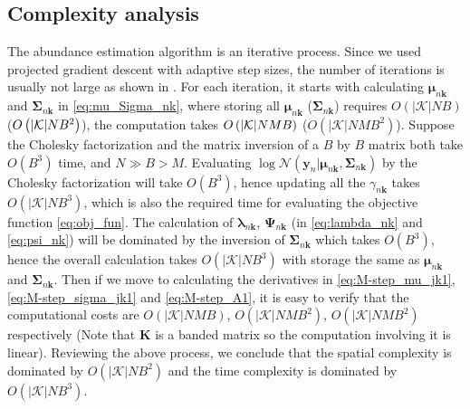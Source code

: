 \documentclass[twocolumn,english]{IEEEtran}
\theoremstyle{plain}
\begin{document}
\subsection{Complexity analysis\label{subsec:Complexity-Analysis}}

The abundance estimation algorithm is an iterative process. Since
we used projected gradient descent with adaptive step sizes, the number
of iterations is usually not large as shown in \cite{guan2011manifold,lin2007projected}.
For each iteration, it starts with calculating $\boldsymbol{\mu}_{n\mathbf{k}}$
and $\boldsymbol{\Sigma}_{n\mathbf{k}}$ in \eqref{eq:mu_Sigma_nk},
where storing all $\boldsymbol{\mu}_{n\mathbf{k}}$ ($\boldsymbol{\Sigma}_{n\mathbf{k}}$)
requires $O\left(\left|\mathcal{K}\right|NB\right)$ ($O\left(\text{\ensuremath{\left|\mathcal{K}\right|}}NB^{2}\right)$),
the computation takes $O\left(\text{\ensuremath{\left|\mathcal{K}\right|}}NMB\right)$
($O\left(\left|\mathcal{K}\right|NMB^{2}\right)$). Suppose the Cholesky
factorization and the matrix inversion of a $B$ by $B$ matrix both
take $O\left(B^{3}\right)$ time, and $N\gg B>M$. Evaluating $\log\mathcal{N}\left(\mathbf{y}_{n}\vert\boldsymbol{\mu}_{n\mathbf{k}},\boldsymbol{\Sigma}_{n\mathbf{k}}\right)$
by the Cholesky factorization will take $O\left(B^{3}\right)$, hence
updating all the $\gamma_{n\mathbf{k}}$ takes $O\left(\left|\mathcal{K}\right|NB^{3}\right)$,
which is also the required time for evaluating the objective function
\eqref{eq:obj_fun}. The calculation of $\boldsymbol{\lambda}_{n\mathbf{k}}$,
$\boldsymbol{\Psi}_{n\mathbf{k}}$ (in \eqref{eq:lambda_nk} and \eqref{eq:psi_nk})
will be dominated by the inversion of $\boldsymbol{\Sigma}_{n\mathbf{k}}$
which takes $O\left(B^{3}\right)$, hence the overall calculation
takes $O\left(\left|\mathcal{K}\right|NB^{3}\right)$ with storage
the same as $\boldsymbol{\mu}_{n\mathbf{k}}$ and $\boldsymbol{\Sigma}_{n\mathbf{k}}$.
Then if we move to calculating the derivatives in \eqref{eq:M-step_mu_jk1},
\eqref{eq:M-step_sigma_jk1} and \eqref{eq:M-step_A1}, it is easy
to verify that the computational costs are $O\left(\left|\mathcal{K}\right|NMB\right)$,
$O\left(\left|\mathcal{K}\right|NMB^{2}\right)$, $O\left(\left|\mathcal{K}\right|NMB^{2}\right)$
respectively (Note that $\mathbf{K}$ is a banded matrix so the computation
involving it is linear). Reviewing the above process, we conclude
that the spatial complexity is dominated by $O\left(\left|\mathcal{K}\right|NB^{2}\right)$
and the time complexity is dominated by $O\left(\left|\mathcal{K}\right|NB^{3}\right)$.
\end{document}
